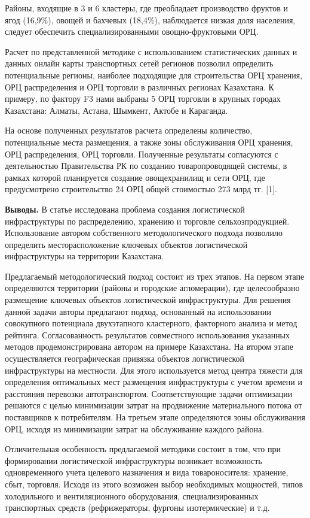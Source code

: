 \begin{multicols}{2}
Районы, входящие в 3 и 6 кластеры, где преобладает производство фруктов
и ягод (16,9\%), овощей и бахчевых (18,4\%), наблюдается низкая доля
населения, следует обеспечить специализированными овощно-фруктовыми ОРЦ.

Расчет по представленной методике с использованием статистических данных
и данных онлайн карты транспортных сетей регионов позволил определить
потенциальные регионы, наиболее подходящие для строительства ОРЦ
хранения, ОРЦ распределения и ОРЦ торговли в различных регионах
Казахстана. К примеру, по фактору F3 нами выбраны 5 ОРЦ торговли в
крупных городах Казахстана: Алматы, Астана, Шымкент, Актобе и Караганда.

На основе полученных результатов расчета определены количество,
потенциальные места размещения, а также зоны обслуживания ОРЦ хранения,
ОРЦ распределения, ОРЦ торговли. Полученные результаты согласуются с
деятельностью Правительства РК по созданию товаропроводящей системы, в
рамках которой планируется создание овощехранилищ и сети ОРЦ, где
предусмотрено строительство 24 ОРЦ общей стоимостью 273 млрд тг.
{[}1{]}.

{\bfseries Выводы.} В статье исследована проблема создания логистической
инфраструктуры по распределению, хранению и торговле сельхозпродукцией.
Использование автором собственного методологического подхода позволило
определить месторасположение ключевых объектов логистической
инфраструктуры на территории Казахстана.

Предлагаемый методологический подход состоит из трех этапов. На первом
этапе определяются территории (районы и городские агломерации), где
целесообразно размещение ключевых объектов логистической инфраструктуры.
Для решения данной задачи авторы предлагают подход, основанный на
использовании совокупного потенциала двухэтапного кластерного,
факторного анализа и метод рейтинга. Согласованность результатов
совместного использования указанных методов продемонстрирована автором
на примере Казахстана. На втором этапе осуществляется географическая
привязка объектов логистической инфраструктуры на местности. Для этого
используется метод центра тяжести для определения оптимальных мест
размещения инфраструктуры с учетом времени и расстояния перевозки
автотранспортом. Соответствующие задачи оптимизации решаются с целью
минимизации затрат на продвижение материального потока от поставщиков к
потребителям. На третьем этапе определяются зоны обслуживания ОРЦ,
исходя из минимизации затрат на обслуживание каждого района.

Отличительная особенность предлагаемой методики состоит в том, что при
формировании логистической инфраструктуры возникает возможность
одновременного учета целевого назначения и вида товароносителя:
хранение, сбыт, торговля. Исходя из этого возможен выбор необходимых
мощностей, типов холодильного и вентиляционного оборудования,
специализированных транспортных средств (рефрижераторы, фургоны
изотермические) и т.д.


\end{multicols}
